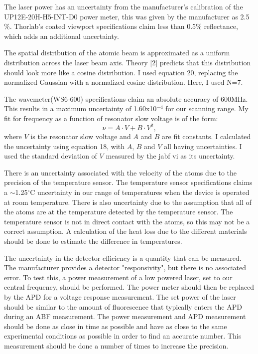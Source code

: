\documentclass[12pt, a4paper]{article}
\begin{document}
The laser power has an uncertainty from the manufacturer's calibration of the UP12E-20H-H5-INT-D0 power meter, this was given by the manufacturer as 2.5 \%. Thorlab's coated viewport specifications claim less than 0.5\% reflectance, which adds an additional uncertainty.

The spatial distribution of the atomic beam is approximated as a uniform distribution across the laser beam axis. Theory [2] predicts that this distribution should look more like a cosine distribution. I used equation 20, replacing the normalized Gaussian with a normalized cosine distribution. Here, I used N=7.

The wavemeter(WS6-600) specifications claim an absolute accuracy of 600MHz. This results in a maximum uncertainty of 1.60x10$^{-4}$ for our scanning range. My fit for frequency as a function of resonator slow voltage is of the form:
\begin{equation}
\nu = A \cdot V + B \cdot V^2,
\end{equation}
where $V$ is the resonator slow voltage and $A$ and $B$ are fit constants. I calculated the uncertainty using equation 18, with $A$, $B$ and $V$ all having uncertainties. I used the standard deviation of $V$ measured by the jabf vi as its uncertainty.

There is an uncertainty associated with the velocity of the atoms due to the precision of the temperature sensor. The temperature sensor specifications claims a $\sim$1.25$^{\circ}$C  uncertainty in our range of temperatures when the device is operated at room temperature. There is also uncertainty due to the assumption that all of the atoms are at the temperature detected by the temperature sensor. The temperature sensor is not in direct contact with the atoms, so this may not be a correct assumption. A calculation of the heat loss due to the different materials should be done to estimate the difference in temperatures.

The uncertainty in the detector efficiency is a quantity that can be measured. The manufacturer provides a detector "responsivity", but there is no associated error. To test this, a power measurement of a low powered laser, set to our central frequency, should be performed. The power meter should then be replaced by the APD for a voltage response measurement. The set power of the laser should be similar to the amount of fluorescence that typically enters the APD during an ABF measurement. The power measurement and APD measurement should be done as close in time as possible and have as close to the same experimental conditions as possible in order to find an accurate number. This measurement should be done a number of times to increase the precision.
\end{document}
